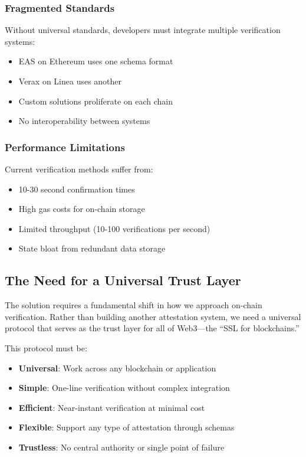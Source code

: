 \documentclass[11pt,a4paper]{article}
\begin{document}
\subsubsection{Fragmented Standards}
Without universal standards, developers must integrate multiple verification systems:
\begin{itemize}
    \item EAS on Ethereum uses one \gls{schema} format
    \item Verax on Linea uses another
    \item Custom solutions proliferate on each chain
    \item No interoperability between systems
\end{itemize}

\subsubsection{Performance Limitations}
Current verification methods suffer from:
\begin{itemize}
    \item 10-30 second confirmation times
    \item High gas costs for on-chain storage
    \item Limited throughput (10-100 verifications per second)
    \item State bloat from redundant data storage
\end{itemize}

\subsection{The Need for a Universal Trust Layer}

The solution requires a fundamental shift in how we approach on-chain verification. Rather than building another attestation system, we need a universal protocol that serves as the trust layer for all of Web3---the ``SSL for blockchains.''

This protocol must be:
\begin{itemize}
    \item \textbf{Universal}: Work across any blockchain or application
    \item \textbf{Simple}: One-line verification without complex integration
    \item \textbf{Efficient}: Near-instant verification at minimal cost
    \item \textbf{Flexible}: Support any type of attestation through schemas
    \item \textbf{Trustless}: No central authority or single point of failure
\end{itemize}
\end{document}
